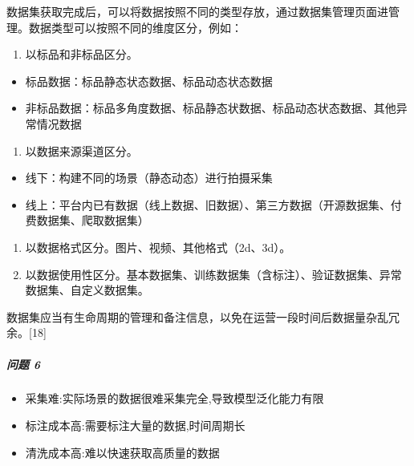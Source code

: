 \documentclass[letterpaper,11pt,english]{sphinxmanual}
\begin{document}
数据集获取完成后，可以将数据按照不同的类型存放，通过数据集管理页面进管理。数据类型可以按照不同的维度区分，例如：
\begin{enumerate}
%
\item {} 
以标品和非标品区分。

\end{enumerate}
\begin{itemize}
\item {} 
标品数据：标品静态状态数据、标品动态状态数据

\item {} 
非标品数据：标品多角度数据、标品静态状数据、标品动态状态数据、其他异常情况数据

\end{itemize}
\begin{enumerate}
%
\setcounter{enumi}{1}
\item {} 
以数据来源渠道区分。

\end{enumerate}
\begin{itemize}
\item {} 
线下：构建不同的场景（静态动态）进行拍摄采集

\item {} 
线上：平台内已有数据（线上数据、旧数据）、第三方数据（开源数据集、付费数据集、爬取数据集）

\end{itemize}
\begin{enumerate}
%
\setcounter{enumi}{2}
\item {} 
以数据格式区分。图片、视频、其他格式（2d、3d）。

\item {} 
以数据使用性区分。基本数据集、训练数据集（含标注）、验证数据集、异常数据集、自定义数据集。

\end{enumerate}

数据集应当有生命周期的管理和备注信息，以免在运营一段时间后数据量杂乱冗余。{[}18{]}


\subparagraph{问题 6\sphinxfootnotemark[315]}
\label{\detokenize{chapter_idea/data:id13}}%
\begin{footnotetext}[314]\sphinxAtStartFootnote
{}
%
\end{footnotetext}\ignorespaces %
\begin{footnotetext}[315]\sphinxAtStartFootnote
{}
%
\end{footnotetext}\ignorespaces \begin{itemize}
\item {} 
采集难:实际场景的数据很难采集完全,导致模型泛化能力有限

\item {} 
标注成本高:需要标注大量的数据,时间周期长

\item {} 
清洗成本高:难以快速获取高质量的数据

\end{itemize}
\end{document}
